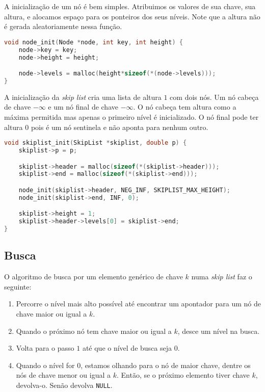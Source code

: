 \documentclass[paper=a4, fontsize=11pt]{scrartcl} %
\numberwithin{equation}{section}
\numberwithin{figure}{section}
\numberwithin{table}{section}
\numberwithin{definition}{section}
\numberwithin{theorem}{section}
\numberwithin{property}{section}
\numberwithin{proposition}{section}
\newcommand{\skl}{\textit{skip list}\xspace}
\renewcommand{\sl}{\textit{skip list}\xspace}
\begin{document}
A inicialização de um nó é bem simples. Atribuimos os valores de sua chave, sua altura, e alocamos espaço
para os ponteiros dos seus níveis. Note que a altura não é gerada aleatoriamente nessa função.
\begin{lstlisting}[caption=Inicialização de um nó., language=C]
void node_init(Node *node, int key, int height) {
    node->key = key;
    node->height = height;

    node->levels = malloc(height*sizeof(*(node->levels)));
}
\end{lstlisting}

A inicialização da \sl cria uma lista de altura $1$ com dois nós. Um nó cabeça de chave $-\infty$ e um nó final de
chave $-\infty$. O nó cabeça tem altura como a máxima permitida mas apenas o primeiro nível é inicializado. O nó final pode 
ter altura $0$ pois é um nó sentinela e não aponta para nenhum outro.

\begin{lstlisting}[caption=Inicialização de uma skip list., language=C]
void skiplist_init(SkipList *skiplist, double p) {
    skiplist->p = p;

    skiplist->header = malloc(sizeof(*(skiplist->header)));
    skiplist->end = malloc(sizeof(*(skiplist->end)));

    node_init(skiplist->header, NEG_INF, SKIPLIST_MAX_HEIGHT);
    node_init(skiplist->end, INF, 0);

    skiplist->height = 1;
    skiplist->header->levels[0] = skiplist->end;
}
\end{lstlisting}

\FloatBarrier
\subsection{Busca}

O algoritmo de busca por um elemento genérico de chave $k$ numa \skl faz o seguinte:
\begin{enumerate}
  \item Percorre o nível mais alto possível até encontrar um apontador para um nó de chave maior ou igual
a $k$.
  \item Quando o próximo nó tem chave maior ou igual a $k$, desce um nível na busca.
  \item Volta para o passo $1$ até que o nível de busca seja $0$.
  \item Quando o nível for $0$, estamos olhando para o nó de maior chave, dentre os nós de chave 
  menor ou igual a $k$. Então, se o próximo elemento tiver chave $k$, devolva-o. Senão devolva \verb|NULL|.
\end{enumerate}
\end{document}
